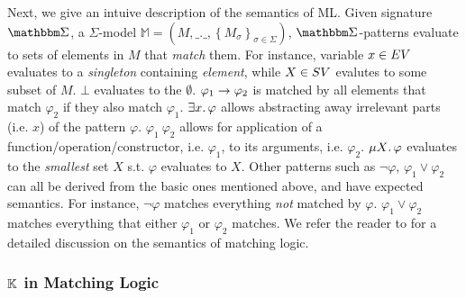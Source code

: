 Next, we give an intuive description of the semantics of ML.
Given signature $\MLSigma$, a $\Sigma$-model
$\mathbb{M} = \left(M,\_.\_,\left\{M_{\sigma}\right\}_{\sigma \in \Sigma}\right)$,
$\MLSigma$-patterns evaluate to sets of elements in $M$ that \emph{match} them.
For instance, variable $x \in EV$ evaluates to a \emph{singleton}
containing \emph{element}, while $X \in SV$ evalutes to some subset of $M$. $\bot$
evaluates to the $\emptyset$.
$\varphi_1 \to \varphi_2$ is matched by all elements that match $\varphi_2$
if they also match $\varphi_1$. $\exists x \mathord{.\,} \varphi$ allows abstracting
away irrelevant parts (i.e. $x$) of the pattern $\varphi$. $\varphi_1\
\varphi_2$ allows for application of a function/operation/constructor,
i.e. $\varphi_1$, to its arguments, i.e. $\varphi_2$. $\mu X \mathord{.\,} \varphi$
evaluates to the \emph{smallest} set $X$ s.t. $\varphi$ evaluates to $X$.
Other patterns such as $\neg \varphi$, $\varphi_1 \vee \varphi_2$ can all be
derived from the basic ones mentioned above, and have expected semantics.
For instance, $\neg \varphi$ matches everything \emph{not} matched by
$\varphi$. $\varphi_1 \vee \varphi_2$ matches everything that either
$\varphi_1$ or $\varphi_2$ matches. We refer the reader to \cite{ChenTR20}
for a detailed discussion on the semantics of matching logic.

\subsubsection{$\mathbb{K}$ in Matching Logic}

